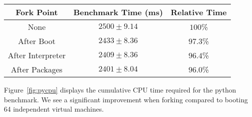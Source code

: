 
\pgfplotsset{compat=1.5}
\begin{figure*}[t]
  \center
  \label{fig:pybench}
\caption{Cumulative CPU time for 64 runs of python benchmark}
\label{fig:pycpu}
\end{figure*}

\begin{figure*}
  \center
  \begin{tabular}{|c|c|c|}
    \hline
    Fork Point & Benchmark Time (ms) & Relative Time \\ \hline
    None & $2500 \pm 9.14$ & $100$\% \\ \hline
    After Boot & $2433 \pm 8.36$ & $97.3$\% \\ \hline
    After Interpreter & $2409 \pm 8.36$ & $96.4$\% \\ \hline
    After Packages & $2401 \pm 8.04$ & $96.0$\% \\ \hline
  \end{tabular}

  \caption{Mean benchmark completion time (with $95$\% confidence interval)}
  \label{}
\end{figure*}


 Figure~\ref{fig:pycpu} displays the cumulative CPU
time required for the python benchmark. We see a significant improvement when
forking compared to booting 64 independent virtual machines. %

